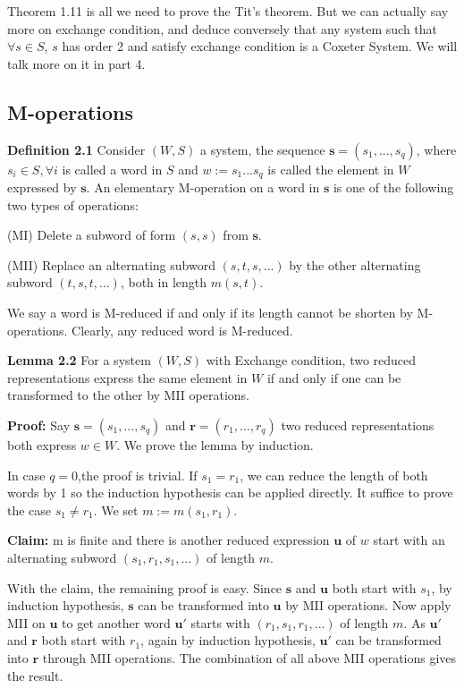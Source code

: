 \vspace{\baselineskip}
Theorem 1.11 is all we need to prove the Tit's theorem. But we can actually say more on exchange condition, and deduce conversely that any system such that $\forall s\in S$, $s$ has order 2 and satisfy exchange condition is a Coxeter System. We will talk more on it in part 4.

\subsection{M-operations}
\noindent \textbf{Definition 2.1} Consider $(W,S)$ a system, the sequence $\mathbf{s}=(s_1,...,s_q)$, where $s_i \in S,\forall i$ is called a word in $S$ and $w:=s_1...s_q$ is called the element in $W$ expressed by $\mathbf{s}$. An elementary M-operation on a word in $\mathbf{s}$ is one of the following two types of operations:

(MI) Delete a subword of form $(s,s)$ from $\mathbf{s}$.

(MII) Replace an alternating subword $(s,t,s,...)$ by the other alternating subword $(t,s,t,...)$, both in length $m(s,t)$.

We say a word is M-reduced if and only if its length cannot be shorten by M-operations. Clearly, any reduced word is M-reduced.

\vspace{\baselineskip}
\noindent \textbf{Lemma 2.2} For a system $(W,S)$ with Exchange condition, two reduced representations express the same element in $W$ if and only if one can be transformed to the other by MII operations.

\vspace{0.5\baselineskip} 
\noindent \textbf{Proof:} Say $\mathbf{s}=(s_1,...,s_q)$ and $\mathbf{r}=(r_1,...,r_q)$ two reduced representations both express $w \in W$. We prove the lemma by induction. 

In case $q=0$,the proof is trivial. If $s_1=r_1$, we can reduce the length of both words by 1 so the induction hypothesis can be applied directly. It suffice to prove the case $s_1 \ne r_1$. We set $m:=m(s_1,r_1)$.

\vspace{0.5\baselineskip}
\noindent \textbf{Claim:} m is finite and there is another reduced expression $\mathbf{u}$ of $w$ start with an alternating subword $(s_1,r_1,s_1,...)$ of length $m$.

\vspace{0.5\baselineskip}
With the claim, the remaining proof is easy. Since $\mathbf{s}$ and $\mathbf{u}$ both start with $s_1$, by induction hypothesis, $\mathbf{s}$ can be transformed into $\mathbf{u}$ by MII operations. Now apply MII on $\mathbf{u}$ to get another word $\mathbf{u'}$ starts with $(r_1,s_1,r_1,...)$ of length $m$. As $\mathbf{u'}$ and $\mathbf{r}$ both start with $r_1$, again by induction hypothesis, $\mathbf{u'}$ can be transformed into $\mathbf{r}$ through MII operations. The combination of all above MII operations gives the result. 

